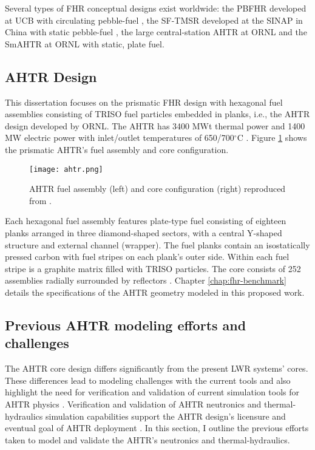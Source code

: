 Several types of \gls{FHR} conceptual designs exist worldwide: the \gls{PBFHR} 
developed at \gls{UCB} with circulating pebble-fuel 
\cite{scarlat_current_2014,krumwiede_three-dimensional_2013}, the \gls{SF-TMSR} 
developed at the \gls{SINAP} in China with static pebble-fuel \cite{liu_preliminary_2016}, 
the large central-station \gls{AHTR} at \gls{ORNL} \cite{holcomb_core_2011, varma_ahtr_2012} and 
the \gls{SmAHTR} at ORNL \cite{greene_pre-conceptual_2010} with static, plate fuel. 

\subsection{\acrlong{AHTR} Design}
This dissertation focuses on the prismatic \gls{FHR} design with hexagonal fuel 
assemblies consisting of \gls{TRISO} fuel particles embedded in planks, i.e., 
the \gls{AHTR} design developed by ORNL. 
The \gls{AHTR} has 3400 MWt thermal power and 1400 MW electric power with
inlet/outlet temperatures of 650/700$^{\circ}$C \cite{varma_ahtr_2012}.  
Figure \ref{fig:ahtr} shows the prismatic AHTR's fuel assembly and core 
configuration.  
\begin{figure}[]
    \centering
    \texttt{[image: ahtr.png]} 
    \caption{\acrlong{AHTR} fuel assembly (left) and core configuration (right) 
    reproduced from \cite{ramey_monte_2018}.}
    \label{fig:ahtr}
\end{figure}
Each hexagonal fuel assembly features plate-type fuel consisting of eighteen 
planks arranged in three diamond-shaped sectors, with a central Y-shaped 
structure and external channel (wrapper).
The fuel planks contain an isostatically pressed carbon with fuel stripes 
on each plank's outer side.
Within each fuel stripe is a graphite matrix filled with \gls{TRISO} particles. 
The core consists of 252 assemblies radially surrounded by reflectors
\cite{ramey_monte_2018}. 
Chapter \ref{chap:fhr-benchmark} details the specifications of the AHTR geometry
modeled in this proposed work.

\subsection{Previous AHTR modeling efforts and challenges} 
\label{sec:previous_ahtr}
The \gls{AHTR} core design differs significantly from the present \gls{LWR} 
systems' cores. 
These differences lead to modeling challenges with the current tools and also 
highlight the need for verification and validation of current simulation tools 
for \gls{AHTR} physics \cite{ramey_monte_2018}. 
Verification and validation of \gls{AHTR} neutronics and thermal-hydraulics 
simulation capabilities support the \gls{AHTR} design's licensure and 
eventual goal of \gls{AHTR} deployment 
\cite{rahnema_phenomena_2019,rahnema_current_2015}.
In this section, I outline the previous efforts taken to model and validate 
the \gls{AHTR}'s neutronics and thermal-hydraulics. 

